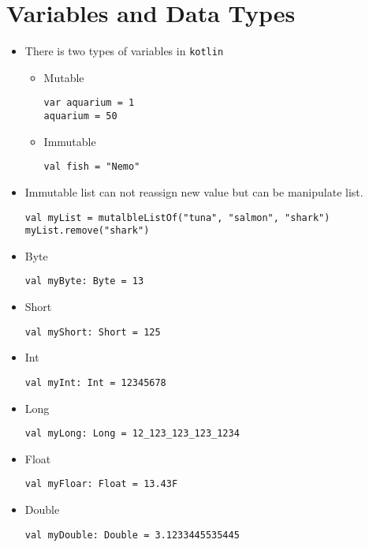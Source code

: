 \documentclass[11pt]{article}
\begin{document}
\section*{Variables and Data Types}
\label{sec:orgebdc62d}
\begin{itemize}
\item There is two types of variables in \texttt{kotlin}
\begin{itemize}
\item Mutable
\begin{verbatim}
var aquarium = 1
aquarium = 50
\end{verbatim}

\item Immutable 
\begin{verbatim}
val fish = "Nemo"
\end{verbatim}
\end{itemize}

\item Immutable list can not reassign new value but can be manipulate
list.
\begin{verbatim}
val myList = mutalbleListOf("tuna", "salmon", "shark")
myList.remove("shark")
\end{verbatim}

\item Byte
\begin{verbatim}
val myByte: Byte = 13
\end{verbatim}

\item Short
\begin{verbatim}
val myShort: Short = 125
\end{verbatim}

\item Int
\begin{verbatim}
val myInt: Int = 12345678
\end{verbatim}

\item Long
\begin{verbatim}
val myLong: Long = 12_123_123_123_1234
\end{verbatim}

\item Float
\begin{verbatim}
val myFloar: Float = 13.43F
\end{verbatim}

\item Double
\begin{verbatim}
val myDouble: Double = 3.1233445535445
\end{verbatim}


\end{itemize}
\end{document}

